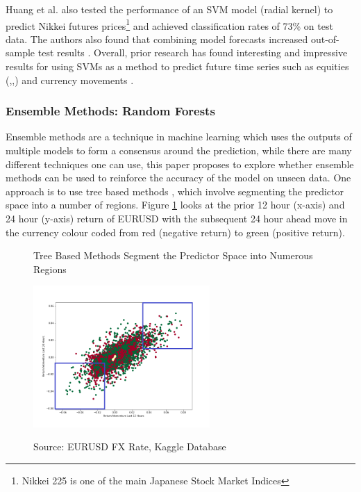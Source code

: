 \documentclass[11pt]{article}
\begin{document}
Huang et al. also tested the performance of an SVM model (radial kernel) to predict Nikkei futures prices\footnote{Nikkei 225 is one of the main Japanese Stock Market Indices} and achieved classification rates of 73\% on test data. The authors also found that combining model forecasts increased out-of-sample test results \cite{Huang2005}.
Overall, prior research has found interesting and impressive results for using SVMs as a method to predict future time series such as equities (\cite{Gui2015},\cite{Shen2012},\cite{Kim2003}) and currency movements \cite{Kamruzzaman2004}.

\subsubsection{Ensemble Methods: Random Forests}
Ensemble methods are a technique in machine learning which uses the outputs of multiple models to form a consensus around the prediction, while there are many different techniques one can use, this paper proposes to explore whether ensemble methods can be used to reinforce the accuracy of the model on unseen data. One approach is to use tree based methods \cite{Podgorelec2015}, which involve segmenting the predictor space into a number of regions.  Figure \ref{fig:EURUSDMomentum} looks at the prior 12 hour (x-axis) and 24 hour (y-axis) return of EURUSD with the subsequent 24 hour ahead move in the currency colour coded from red (negative return) to green (positive return). 
\begin{figure}[h]
    \centering
	\caption{Tree Based Methods Segment the Predictor Space into Numerous Regions}    
	\includegraphics[width=0.6\textwidth]{EURUSDMomentum}
    \label{fig:EURUSDMomentum}
     \caption*{\small Source: EURUSD FX Rate, Kaggle Database}
\end{figure}
\end{document}
